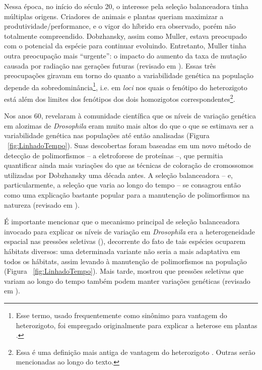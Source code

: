 \begin{refsection}
	Nessa época, no início do século 20, o interesse pela seleção balanceadora tinha múltiplas origens. Criadores de animais e plantas queriam maximizar a produtividade/performance, e o vigor do híbrido era observado, porém não totalmente compreendido. Dobzhansky, assim como Muller, estava preocupado com o potencial da espécie para continuar evoluindo. Entretanto, Muller tinha outra preocupação mais \enquote{urgente}: o impacto do aumento da taxa de mutação causada por radiação nas gerações futuras (revisado em \cite{Crow1987a}). Essas três preocupações giravam em torno do quanto a variabilidade genética na população depende da sobredominância\footnote{Esse termo, usado frequentemente como sinônimo para vantagem do heterozigoto, foi empregado originalmente para explicar a heterose em plantas \parencite{Hedrick2012}.}, i.e. em \emph{loci} nos quais o fenótipo do heterozigoto está além dos limites dos fenótipos dos dois homozigotos correspondentes\footnote{Essa é uma definição mais antiga de vantagem do heterozigoto \parencite{Crow1987a}. Outras serão mencionadas ao longo do texto.}.
%


Nos anos 60, \textcite{Lewontin1966} revelaram à comunidade científica que os níveis de variação genética em alozimas de \emph{Drosophila} eram muito mais altos do que o que se estimava ser a variabilidade genética nas populações até então analisadas (Figura ~\ref{fig:LinhadoTempo}). Suas descobertas foram baseadas em um novo método de detecção de polimorfismos -- a eletroforese de proteínas --, que permitia quantificar ainda mais variações do que as técnicas de coloração de cromossomos utilizadas por Dobzhansky uma década antes. A seleção balanceadora -- e, particularmente, a seleção que varia ao longo do tempo -- se consagrou então como uma explicação bastante popular para a manutenção de polimorfismos na natureza (revisado em \cite{Bamshad2003,Gloss2016}).
%

	É importante mencionar que o mecanismo principal de seleção balanceadora invocado para explicar os níveis de variação em \emph{Drosophila} era a heterogeneidade espacial nas pressões seletivas (\cite{Levene1953}), decorrente do fato de tais espécies ocuparem hábitats diversos: uma determinada variante não seria a mais adaptativa em todos os hábitats, assim levando à manutenção de polimorfismos na população (Figura ~\ref{fig:LinhadoTempo}). Mais tarde, \textcite{Dempster1955} mostrou que pressões seletivas que variam ao longo do tempo também podem manter variações genéticas (revisado em \cite{Gloss2016}). 
    

\end{refsection}
